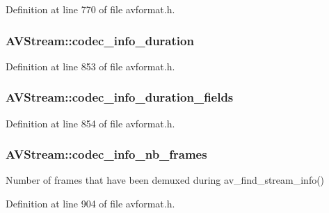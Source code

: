 Definition at line 770 of file avformat.\+h.

\subsubsection[{\texorpdfstring{codec\+\_\+info\+\_\+duration}{codec_info_duration}}]{ A\+V\+Stream\+::codec\+\_\+info\+\_\+duration}\hypertarget{struct_a_v_stream_a55fa61f39b931338e5ba270f3be7a28e}{}\label{struct_a_v_stream_a55fa61f39b931338e5ba270f3be7a28e}


Definition at line 853 of file avformat.\+h.

\subsubsection[{\texorpdfstring{codec\+\_\+info\+\_\+duration\+\_\+fields}{codec_info_duration_fields}}]{ A\+V\+Stream\+::codec\+\_\+info\+\_\+duration\+\_\+fields}\hypertarget{struct_a_v_stream_a5cf5e17cd1a56b141b588225fe7cf272}{}\label{struct_a_v_stream_a5cf5e17cd1a56b141b588225fe7cf272}


Definition at line 854 of file avformat.\+h.

\subsubsection[{\texorpdfstring{codec\+\_\+info\+\_\+nb\+\_\+frames}{codec_info_nb_frames}}]{ A\+V\+Stream\+::codec\+\_\+info\+\_\+nb\+\_\+frames}\hypertarget{struct_a_v_stream_adc161a5c5773d42cea315a5ad0454cf2}{}\label{struct_a_v_stream_adc161a5c5773d42cea315a5ad0454cf2}
Number of frames that have been demuxed during av\+\_\+find\+\_\+stream\+\_\+info() 

Definition at line 904 of file avformat.\+h.

